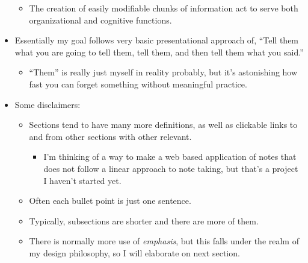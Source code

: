 \documentclass{inVerba-notes}
\begin{document}
\begin{itemize}
\begin{itemize}
            \item The creation of easily modifiable chunks of information act to serve both organizational and cognitive functions.
        \end{itemize}
    \item Essentially my goal follows very basic presentational approach of, ``Tell them what you are going to tell them, tell them, and then tell them what you said.''
        \begin{itemize}
            \item ``Them'' is really just myself in reality probably, but it's astonishing how fast you can forget something without meaningful practice.
        \end{itemize}
    \item Some disclaimers:
            \begin{itemize}
                \item Sections tend to have many more definitions, as well as clickable links to and from other sections with other relevant.
                    \begin{itemize}
                        \item I'm thinking of a way to make a web based application of notes that does not follow a linear approach to note taking, but that's a project I haven't started yet.
                    \end{itemize}
                \item Often each bullet point is just one sentence.
                \item Typically, subsections are shorter and there are more of them.
                \item There is normally more use of \emph{emphasis}, but this falls under the realm of my design philosophy, so I will elaborate on next section. 
            \end{itemize}
    \end{itemize}
\end{document}
